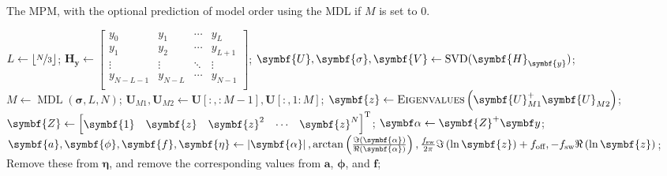 \begin{algorithm}
    \caption[
        The \acs{MPM}, with the optional prediction of model order using the
        \acs{MDL}.
    ]
    {
        The \acs{MPM}, with the optional prediction of model order using the
        \acs{MDL} if $M$ is set to $0$.
    }\label{alg:mpm}
    \begin{algorithmic}[1]
            \State $L \gets \left\lfloor \nicefrac{N}{3} \right\rfloor$;
            \State $\symbf{H}_{\symbf{y}} \gets
                \begin{bmatrix}
                    y_{0} & y_{1} & \cdots & y_{L}\\
                    y_{1} & y_{2} & \cdots & y_{L+1}\\
                    \vdots & \vdots & \ddots & \vdots\\
                    y_{N-L-1} & y_{N-L} & \cdots & y_{N-1}\\
                \end{bmatrix}
            $;
            \State $\symbf{U}, \symbf{\sigma}, \symbf{V} \gets
            \SVD(\symbf{H}_{\symbf{y}})$;
                \State $M \gets \operatorname{MDL}(\symbf{\sigma}, L, N)$;
            \EndIf
            \State $\symbf{U}_{M1}, \symbf{U}_{M2} \gets
                \symbf{U}[:, :M-1], \symbf{U}[:, 1:M]
            $;
            \State $\symbf{z} \gets \textsc{Eigenvalues}\left(\symbf{U}_{M1}^+ \symbf{U}_{M2}^{\vphantom{+}}\right)$;
            \State $\symbf{Z} \gets
                \begin{bmatrix}
                    \symbf{1} & \symbf{z} & {\symbf{z}}^2 & \cdots & {\symbf{z}}^{N}
                \end{bmatrix}\T
            $;
            \State $\bdalpha \gets \symbf{Z}^+ \by$;
            \State $
                \symbf{a}, \symbf{\phi}, \symbf{f}, \symbf{\eta} \gets
                \left\lvert\symbf{\alpha}\right\rvert,
                    \arctan \left(\frac{\Im(\symbf{\alpha})}{\Re(\symbf{\alpha})}\right),
                    \frac{\fsw}{2\pi} \Im \left( \ln \symbf{z} \right) + \foff,
                    -\fsw \Re \left( \ln \symbf{z} \right)
                $;
                \State Remove these from $\symbf{\eta}$, and remove the
                corresponding values from
                $\symbf{a}$, $\symbf{\phi}$, and $\symbf{f}$;

\end{algorithmic}
\end{algorithm}
